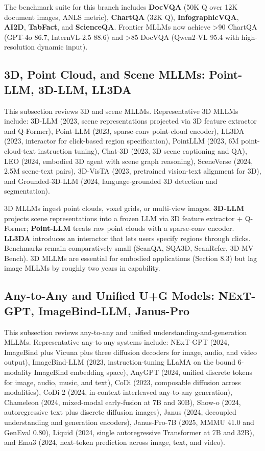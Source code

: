 \documentclass{article}
\begin{document}
The benchmark suite for this branch includes \textbf{DocVQA} (50K Q over 12K document images, ANLS metric), \textbf{ChartQA} (32K Q), \textbf{InfographicVQA}, \textbf{AI2D}, \textbf{TabFact}, and \textbf{ScienceQA}. Frontier MLLMs now achieve \textgreater90 ChartQA (GPT-4o 86.7, InternVL-2.5 88.6) and \textgreater85 DocVQA (Qwen2-VL 95.4 with high-resolution dynamic input).

\subsection{3D, Point Cloud, and Scene MLLMs: Point-LLM, 3D-LLM, LL3DA}\label{d-point-cloud-and-scene-mllms-point-llm-3d-llm-ll3da}

This subsection reviews 3D and scene MLLMs. Representative 3D MLLMs include: 3D-LLM (2023, scene representations projected via 3D feature extractor and Q-Former), Point-LLM (2023, sparse-conv point-cloud encoder), LL3DA (2023, interactor for click-based region specification), PointLLM (2023, 6M point-cloud-text instruction tuning), Chat-3D (2023, 3D scene captioning and QA), LEO (2024, embodied 3D agent with scene graph reasoning), SceneVerse (2024, 2.5M scene-text pairs), 3D-VisTA (2023, pretrained vision-text alignment for 3D), and Grounded-3D-LLM (2024, language-grounded 3D detection and segmentation).

3D MLLMs ingest point clouds, voxel grids, or multi-view images. \textbf{3D-LLM} projects scene representations into a frozen LLM via 3D feature extractor + Q-Former; \textbf{Point-LLM} treats raw point clouds with a sparse-conv encoder. \textbf{LL3DA} introduces an interactor that lets users specify regions through clicks. Benchmarks remain comparatively small (ScanQA, SQA3D, ScanRefer, 3D-MV-Bench). 3D MLLMs are essential for embodied applications (Section 8.3) but lag image MLLMs by roughly two years in capability.

\subsection{Any-to-Any and Unified U+G Models: NExT-GPT, ImageBind-LLM, Janus-Pro}\label{any-to-any-and-unified-ug-models-next-gpt-imagebind-llm-janus-pro}

This subsection reviews any-to-any and unified understanding-and-generation MLLMs. Representative any-to-any systems include: NExT-GPT (2024, ImageBind plus Vicuna plus three diffusion decoders for image, audio, and video output), ImageBind-LLM (2023, instruction-tuning LLaMA on the bound 6-modality ImageBind embedding space), AnyGPT (2024, unified discrete tokens for image, audio, music, and text), CoDi (2023, composable diffusion across modalities), CoDi-2 (2024, in-context interleaved any-to-any generation), Chameleon (2024, mixed-modal early-fusion at 7B and 30B), Show-o (2024, autoregressive text plus discrete diffusion images), Janus (2024, decoupled understanding and generation encoders), Janus-Pro-7B (2025, MMMU 41.0 and GenEval 0.80), Liquid (2024, single autoregressive Transformer at 7B and 32B), and Emu3 (2024, next-token prediction across image, text, and video).
\end{document}
